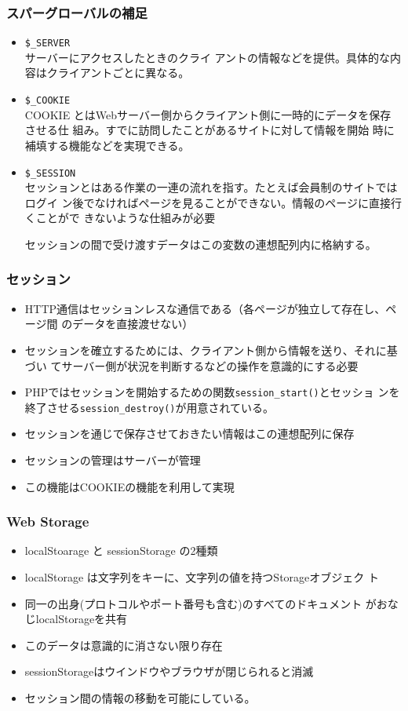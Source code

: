 \documentclass[dvipsk]{beamer}
\begin{document}
\begin{frame}[containsverbatim]
\frametitle{スパーグローバルの補足}
\begin{itemize}
 \item {\texttt{\$\_SERVER}}\\
サーバーにアクセスしたときのクライ
アントの情報などを提供。具体的な内容はクライアントごとに異なる。
 \item \texttt{\$\_COOKIE}\\
COOKIE とはWebサーバー側からクライアント側に一時的にデータを保存させる仕
組み。すでに訪問したことがあるサイトに対して情報を開始
時に補填する機能などを実現できる。
 \item \texttt{\$\_SESSION}\\
セッションとはある作業の一連の流れを指す。たとえば会員制のサイトではログイ
ン後でなければページを見ることができない。情報のページに直接行くことがで
       きないような仕組みが必要

  セッションの間で受け渡すデータはこの変数の連想配列内に格納する。
\end{itemize}
\end{frame}
\begin{frame}[containsverbatim]
\frametitle{セッション}
\begin{itemize}
 \item HTTP通信はセッションレスな通信である（各ページが独立して存在し、ページ間
のデータを直接渡せない）
 \item セッションを確立するためには、クライアント側から情報を送り、それに基づい
てサーバー側が状況を判断するなどの操作を意識的にする必要
 \item PHPではセッションを開始するための関数\texttt{session\_start()}とセッショ
ンを終了させる\texttt{session\_destroy()}が用意されている。
 \item セッションを通じで保存させておきたい情報はこの連想配列に保存
 \item セッションの管理はサーバーが管理
 \item この機能はCOOKIEの機能を利用して実現
\end{itemize}
\end{frame}
 \iffalse
\begin{frame}[containsverbatim]
 \frametitle{Web Storage}
\begin{itemize}
 \item localStoarage と sessionStorage の2種類
 \item localStorage は文字列をキーに、文字列の値を持つStorageオブジェク
ト
 \item 同一の出身(プロトコルやポート番号も含む)のすべてのドキュメント
がおなじlocalStorageを共有
 \item このデータは意識的に消さない限り存在
 \item sessionStorageはウインドウやブラウザが閉じられると消滅
 \item セッション間の情報の移動を可能にしている。
\end{itemize}
\end{frame}
\end{document}
